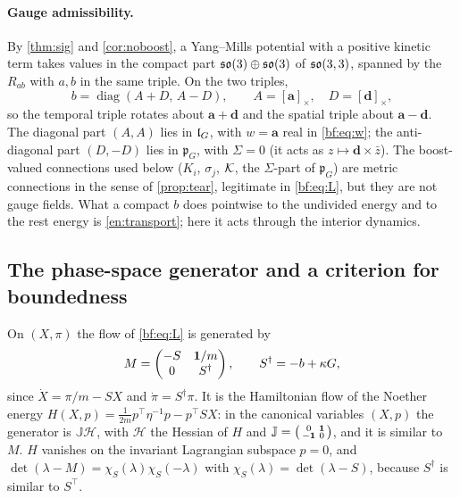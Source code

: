 \paragraph{Gauge admissibility.} By \cref{thm:sig} and \cref{cor:noboost}, a Yang--Mills potential with a positive kinetic term takes values in
the compact part $\mathfrak{so}(3)\oplus\mathfrak{so}(3)$ of $\mathfrak{so}(3,3)$, spanned by the $R_{ab}$ with $a,b$ in the same triple. On the two triples,
\begin{equation}
\label{bf:eq:compact}
b=\operatorname{diag}(A+D,\,A-D),\qquad A=[\mathbf a]_\times,\quad D=[\mathbf d]_\times,
\end{equation}
so the temporal triple rotates about $\mathbf a+\mathbf d$ and the spatial triple about $\mathbf a-\mathbf d$. The diagonal part $(A,A)$ lies in
$\mathfrak l_G$, with $w=\mathbf a$ real in \eqref{bf:eq:w}; the anti-diagonal part $(D,-D)$ lies in $\mathfrak p_G$, with $\Sigma=0$ (it acts as
$z\mapsto\mathbf d\times\bar z$). The boost-valued connections used below ($K_i$, $\sigma_j$, $\mathcal K$, the $\Sigma$-part of $\mathfrak p_G$) are metric
connections in the sense of \cref{prop:tear}, legitimate in \eqref{bf:eq:L}, but they are not gauge fields. What a compact $b$ does pointwise to
the undivided energy and to the rest energy is \cref{en:transport}; here it acts through the interior dynamics.

\subsection{The phase-space generator and a criterion for boundedness}
\label{sec:bf-criterion}

\begin{lemma}
\label{bf:M}
On $(X,\pi)$ the flow of \eqref{bf:eq:L} is generated by
\[
M=\begin{pmatrix}-S&\mathbf 1/m\\0&S^\dagger\end{pmatrix},\qquad S^\dagger=-b+\kappa G,
\]
since $\dot X=\pi/m-SX$ and $\dot\pi=S^\dagger\pi$. It is the Hamiltonian flow of the Noether energy $H(X,p)=\tfrac1{2m}p^{\!\top}\eta^{-1}p-p^{\!\top}SX$:
in the canonical variables $(X,p)$ the generator is $\mathbb J\mathcal H$, with $\mathcal H$ the Hessian of $H$ and
$\mathbb J=\bigl(\begin{smallmatrix}0&\mathbf 1\\-\mathbf 1&0\end{smallmatrix}\bigr)$, and it is similar to $M$. $H$ vanishes on the invariant Lagrangian subspace
$p=0$, and $\det(\lambda-M)=\chi_S(\lambda)\chi_S(-\lambda)$ with $\chi_S(\lambda)=\det(\lambda-S)$, because $S^\dagger$ is similar to $S^{\!\top}$.
\end{lemma}

